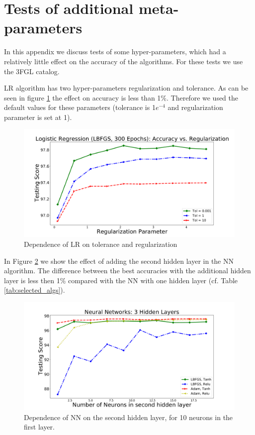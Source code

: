 \section{Tests of additional meta-parameters}

In this appendix we discuss tests of some hyper-parameters, which had a relatively little effect on the 
accuracy of the algorithms. For these tests we use the 3FGL catalog.

LR algorithm has two hyper-parameters regularization and tolerance. 
As can be seen in figure \ref{fig:LR_tol_reg} the effect on accuracy is less than 1\%. Therefore we used the default values for these parameters (tolerance is 1$e^{-4}$ and regularization parameter is set at 1).%
\begin{figure}[h]
\includegraphics[width=\twopicsp\textwidth]{plots/lr_train_reg.pdf}
\caption{Dependence of LR on tolerance and regularization}
\label{fig:LR_tol_reg}
\end{figure}

In Figure \ref{fig:nn_nn} we show the effect of adding the second hidden layer in the NN algorithm.
The difference between the best accuracies with the additional hidden layer is less then 1\%
compared with the NN with one hidden layer (cf. Table \ref{tab:selected_algs}).
\begin{figure}[h]
\includegraphics[width=\twopicsp\textwidth]{plots/nn_2layers_3fgl.pdf}
\caption{Dependence of NN on the second hidden layer, for 10 neurons in the first layer.}
\label{fig:nn_nn}
\end{figure}

